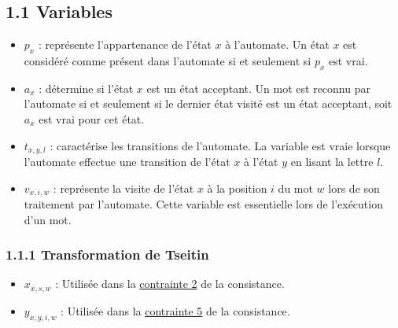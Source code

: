 \documentclass[french]{article}
\begin{document}
\subsection*{1.1 Variables}
\label{variable}

\begin{tcolorbox}[defaultstyle,title=Construction de l'Automate]
\begin{itemize}
    \item[\textbullet] \( p_x \) : représente l'appartenance de l'état \( x \) à l'automate. Un état \( x \) est considéré comme présent dans l'automate si et seulement si \( p_x \) est vrai.
    \item[\textbullet] \( a_x \) : détermine si l'état \( x \) est un état acceptant. Un mot est reconnu par l'automate si et seulement si le dernier état visité est un état acceptant, soit \( a_x \) est vrai pour cet état.
    \item[\textbullet] \( t_{x,y,l} \) : caractérise les transitions de l'automate. La variable est vraie lorsque l'automate effectue une transition de l'état \( x \) à l'état \( y \) en lisant la lettre \( l \).
    
\end{itemize}
\end{tcolorbox}
\begin{tcolorbox}[defaultstyle,title=Exécution sur l'Automate]
    \begin{itemize}
        \item[\textbullet] \( v_{x, i, w} \) : représente la visite de l'état \( x \) à la position \( i \) du mot \( w \) lors de son traitement par l'automate. Cette variable est essentielle lors de l'exécution d'un mot.
    \end{itemize}
\end{tcolorbox}

\subsubsection*{1.1.1 Transformation de Tseitin}


\begin{tcolorbox}[defaultstyle,title=Transformation de Tseitin]
\begin{itemize}
    \item[\textbullet] \( x_{x,s,w} \) : Utilisée dans la \hyperref[contrainte 2]{contrainte 2} de la consistance.
    \item[\textbullet] \( y_{x,y,i,w} \) : Utilisée dans la \hyperref[contrainte 5]{contrainte 5} de la consistance.
\end{itemize}
\end{tcolorbox}
\vspace{0.4cm}
\end{document}
